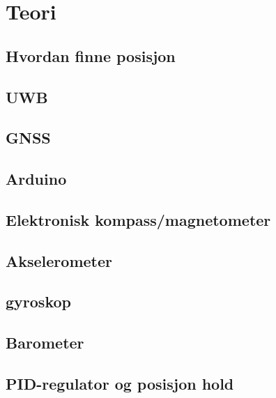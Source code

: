 \documentclass[
10pt, %
a4paper, %
oneside, %
headinclude,footinclude, %
BCOR5mm, %
]{scrartcl}
\begin{document}
\begin{sloppypar}
\newpage


\newpage


\newpage
\section{Teori}

\subsection{Hvordan finne posisjon}


\subsection{UWB}


\subsection{GNSS}


\subsection{Arduino}


\subsection{Elektronisk kompass/magnetometer}


\subsection{Akselerometer}


\subsection{gyroskop}


\subsection{Barometer}


\subsection{PID-regulator og posisjon hold}



\end{sloppypar}
\end{document}
